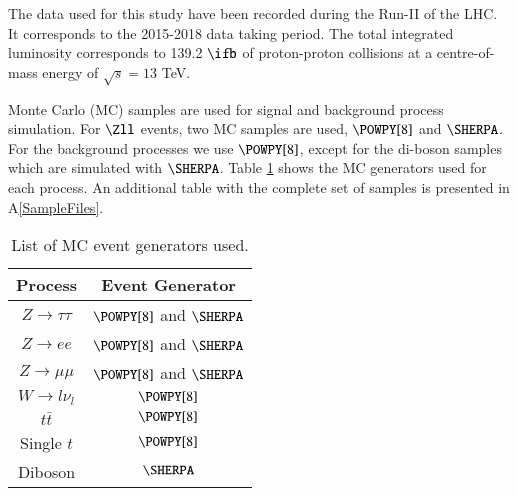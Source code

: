 The data used for this study have been recorded during the Run-II of the LHC. It corresponds to the 2015-2018 data taking period. The total integrated luminosity corresponds to 139.2 $\ifb$ of proton-proton collisions at a centre-of-mass energy of $\sqrt{s}=13$ TeV.

Monte Carlo (MC) samples are used for signal and background process simulation. For $\Zll$ events, two MC samples are used, $\POWPY[8]$ and $\SHERPA$. For the background processes we use $\POWPY[8]$, except for the di-boson samples which are simulated with $\SHERPA$. Table \ref{Table3} shows the MC generators used for each process. An additional table with the complete set of samples is presented in A\ref{SampleFiles}.

\begin{table}[htbp]
	\centering
	\begin{tabular}{cc}
		\hline
		\multicolumn{1}{|c|}{Process}  & \multicolumn{1}{c|}{Event Generator} \\ \hline
		$Z\to\tau\tau$                 & $\POWPY[8]$ and $\SHERPA$           \\
		$Z\to ee$                      & $\POWPY[8]$ and $\SHERPA$           \\
		$Z\to\mu\mu$                   & $\POWPY[8]$ and $\SHERPA$           \\
		$W\to l\nu_l$				   & $\POWPY[8]$                       \\
		$t\bar{t}$                     & $\POWPY[8]$                       \\
		Single $t$                     & $\POWPY[8]$                       \\
		Diboson                        & $\SHERPA$                       \\ \hline
	\end{tabular}
	\caption{List of MC event generators used.}
	\label{Table3}
\end{table}